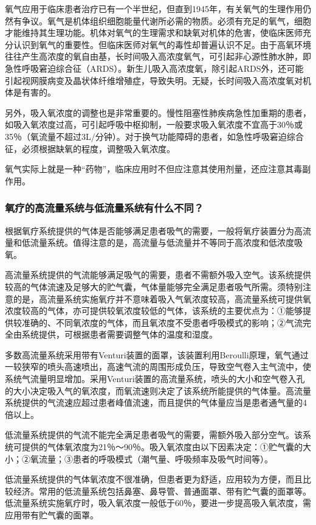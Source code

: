 氧气应用于临床患者治疗已有一个半世纪，但直到1945年，有关氧气的生理作用仍然有争议。氧气是机体组织细胞能量代谢所必需的物质。必须有充足的氧气，细胞才能维持其生理功能。机体对氧气的生理需求和缺氧对机体的危害，使临床医师充分认识到氧气的重要性。但临床医师对氧气的毒性却普遍认识不足。由于高氧环境往往产生高浓度的氧自由基，长时间吸入高浓度氧气，可引起非心源性肺水肿，即急性呼吸窘迫综合征（ARDS）。新生儿吸入高浓度氧，除引起ARDS外，还可能引起视网膜病变及晶状体纤维增殖症，导致失明。无疑，长时间吸入高浓度氧对机体是有害的。

另外，吸入氧浓度的调整也是非常重要的。慢性阻塞性肺疾病急性加重期的患者，如吸入氧浓度过高，可引起呼吸中枢抑制，一般要求吸入氧浓度不宜高于30％或35％（氧流量不超过3L/分钟）。对于换气功能障碍的患者，如急性呼吸窘迫综合征，必须根据缺氧的程度，调整吸入氧浓度。

氧气实际上就是一种“药物”，临床应用时不但应注意其使用剂量，还应注意其毒副作用。

\subsubsection{氧疗的高流量系统与低流量系统有什么不同？}

根据氧疗系统提供的气体是否能够满足患者吸气的需要，一般将氧疗装置分为高流量和低流量系统。值得注意的是，高流量与低流量并不等同于高浓度和低浓度吸氧。

高流量系统提供的气流能够满足吸气的需要，患者不需额外吸入空气。该系统提供较高的气体流速及足够大的贮气囊，气体量能够完全满足患者吸气所需。须特别注意的是，高流量系统实施氧疗并不意味着吸入气氧浓度较高，高流量系统可提供氧浓度较高的气体，亦可提供较氧浓度较低的气体，该系统的主要优点为：①能够提供较准确的、不同氧浓度的气体，而且氧浓度不受患者呼吸模式的影响；②气流完全由系统提供，可根据患者需要调整气体的温度和湿度。

多数高流量系统采用带有Venturi装置的面罩，该装置利用Beroulli原理，氧气通过一较狭窄的喷头高速喷出，高速气流的周围形成负压，导致空气卷入主气流中，使系统气流量明显增加。采用Venturi装置的高流量系统，喷头的大小和空气卷入孔的大小决定吸入气的氧浓度，而氧流速则决定了该系统所能提供的气体量。高流量系统提供的气流速应超过患者峰值流速，而且提供的气体量应当是患者通气量的4倍以上。

低流量系统提供的气流不能完全满足患者吸气的需要，需额外吸入部分空气。该系统可提供的气体氧浓度为21％～90％。吸入氧浓度由以下因素决定：①贮气囊的大小；②氧流量；③患者的呼吸模式（潮气量、呼吸频率及吸气时间等）。

低流量系统提供的气体氧浓度不很准确，但患者更为舒适，应用较为方便，而且比较经济。常用的低流量系统包括鼻塞、鼻导管、普通面罩、带有贮气囊的面罩等。低流量系统实施氧疗时，吸入氧浓度一般低于60％，要进一步提高吸入氧浓度，需应用带有贮气囊的面罩。

